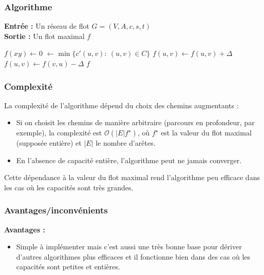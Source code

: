 \documentclass[a4paper]{article}
\begin{document}
\subsubsection{Algorithme}
\begin{algorithm}[H]
\caption{Algorithme de flot maximum}
\textbf{Entrée :} Un réseau de flot $G = (V, A, c, s, t)$ \\
\textbf{Sortie :} Un flot maximal $f$
\begin{algorithmic}[1]
    \State $f(xy) \gets 0$
\EndFor
{}
    \State \Delta $\gets \min \{c'(u, v):\: (u, v)\in C\}$ 
			\State $f(u, v) \gets f(u, v) + \Delta$
		\Else
			\State $f(u, v) \gets f(v, u) - \Delta$
		\EndIf
	\EndFor
\EndWhile
\State \Return $f$
\end{algorithmic}
\end{algorithm}
\subsubsection{Complexité}
La complexité de l’algorithme dépend du choix des chemins augmentants :
\begin{itemize}
    \item Si on choisit les chemins de manière arbitraire (parcours en profondeur, par exemple), la complexité est $\mathcal{O}(|E|f^\star)$, où $f^\star$ est la valeur du flot maximal (supposée entière) et $|E|$ le nombre d’arêtes.
    \item En l’absence de capacité entière, l’algorithme peut ne jamais converger.
\end{itemize}
Cette dépendance à la valeur du flot maximal rend l’algorithme peu efficace dans les cas où les capacités sont très grandes.
\subsubsection{Avantages/inconvénients}
\textbf{Avantages :}
\begin{itemize}
    \item Simple à implémenter mais c'est aussi une très bonne base pour dériver d'autres algorithmes plus efficaces et il fonctionne bien dans des cas où les capacités sont petites et entières.
\end{itemize}
\end{document}
